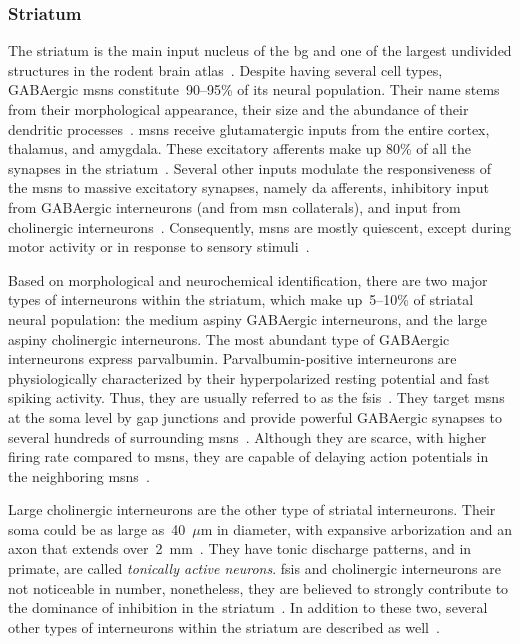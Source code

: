 


\subsubsection{Striatum} \label{intro:anatomy:striatum}
The striatum is the main input nucleus of the \gls{bg} and one of the largest undivided structures in the rodent brain atlas~\cite{Hintiryan2016NN,Hunnicutt2016}.
Despite having several cell types, GABAergic \glspl{msn} constitute~90--95\% of its neural population.
Their name stems from their morphological appearance, their size and the abundance of their dendritic processes~\cite{TURNER2000BasalFunction}.
\Glspl{msn} receive glutamatergic inputs from the entire cortex, thalamus, and amygdala.
These excitatory afferents make up 80\% of all the synapses in the striatum~\cite{Wilson2007GABAergicNeostriatum}.
Several other inputs modulate the responsiveness of the \glspl{msn} to massive excitatory synapses, namely \gls{da} afferents, inhibitory input from GABAergic interneurons (and from \gls{msn} collaterals), and input from cholinergic interneurons~\cite{Dudman2015Book}.
Consequently, \glspl{msn} are mostly quiescent, except during motor activity or in response to sensory stimuli~\cite{KandelBook2001}.
\par
Based on morphological and neurochemical identification, there are two major types of interneurons within the striatum, which make up~5--10\% of striatal neural population:
    the medium aspiny GABAergic interneurons, and the large aspiny cholinergic interneurons.
The most abundant type of GABAergic interneurons express parvalbumin.
Parvalbumin-positive interneurons are physiologically characterized by their hyperpolarized resting potential and fast spiking activity.
Thus, they are usually referred to as the \glspl{fsi}~\cite{Dudman2015Book}.
They target \glspl{msn} at the soma level by gap junctions and provide powerful GABAergic synapses to several hundreds of surrounding \glspl{msn}~\cite{Grillner2016BG, Gage2010FSI}.
Although they are scarce, with higher firing rate compared to \glspl{msn}, they are capable of delaying action potentials in the neighboring \glspl{msn}~\cite{Wilson2007GABAergicNeostriatum}.
\par
Large cholinergic interneurons are the other type of striatal interneurons.
Their soma could be as large as~40~$\mu$m in diameter, with expansive arborization and an axon that extends over~2~mm~\cite{Dudman2015Book}.
They have tonic discharge patterns, and in primate, are called \textit{tonically active neurons}.
\Glspl{fsi} and cholinergic interneurons are not noticeable in number, nonetheless, they are believed to strongly contribute to the dominance of inhibition in the striatum~\cite{Gage2010FSI}.
In addition to these two, several other types of interneurons within the striatum are described as well~\cite[see][]{Grillner2016BG, Dudman2015Book}.

